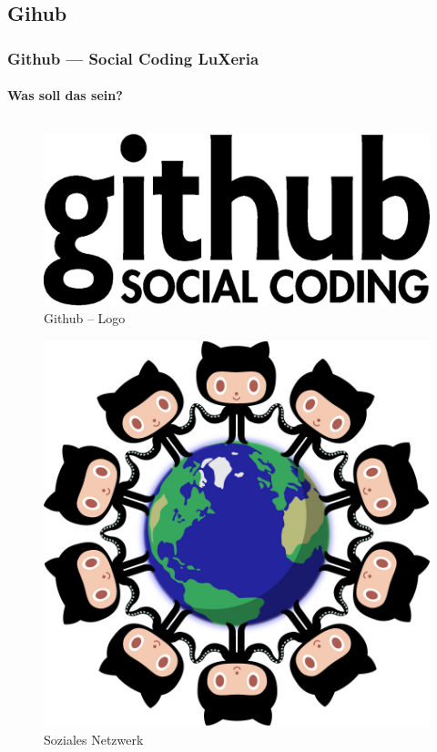 \subsection{Gihub}
\begin{frame}
	\frametitle{Github --- Social Coding \hfill{} LuXeria}
	\framesubtitle{Was soll das sein?}
	\begin{columns}
		\begin{column}{5cm}
			\begin{figure}
				\includegraphics[scale=0.15]{github_logo.eps}
				\caption{Github -- Logo}
			\end{figure}
			\begin{figure}
				\includegraphics[scale=0.08]{github_network.jpg}
				\caption{Soziales Netzwerk}
			\end{figure}

\end{column}
\end{columns}
\end{frame}
